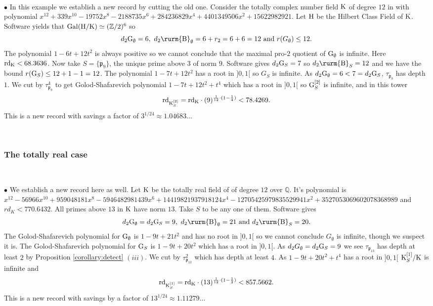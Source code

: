 \documentclass[12pt,a4paper,twoside,english]{smfart}
\def\Q{{\mathbb Q}}
\def\Z{{\mathbb Z}}
\def\p{{\mathfrak p}}
\def\CyB{{{\textnormal{\rurm{B}}}}}
\def\G{{\rm G}}
\def\HH{{\rm H}}
\def\K{{\rm K}}
\def\rd{{\rm rd}}
\def\Gal{{\rm Gal}}
\begin{document}
 \
  
  $\bullet$  
  In this example we establish a new record by cutting the old one.
  Consider the totally complex number field $\K$ of degree $12$ in \cite{Hajir-Maire-JSC} with 
polynomial $x^{12}+339x^{10}-19752x^8-2188735x^6+284236829x^4+4401349506x^2+15622982921$.
 Let $\HH$  be the Hilbert Class Field of 
$\K$.
Software yields that $\Gal(\HH / \K) \simeq (\Z/2)^6$ so 
$$d_2 \G_\emptyset=6,\,\, d_2 \CyB_\emptyset = 6+r_2=6+6=12 \mbox{ and } r(G_\emptyset) \leq 12.$$
The polynomial $1-6t+12t^2$ is always positive so we cannot conclude
that the maximal pro-$2$ quotient of $\G_\emptyset$ is infinite. Here $\rd_{\K} < 68.3636$.
 Now take $S=\{\p_{9}\}$, the unique prime above $3$ of norm $9$. Software gives  $d_2 \G_S=7$ so $d_2 \CyB_S=12$ and 
 we have the bound 
 $r(\G_S) \leq 12+1-1=12$.  The polynomial $1-7t+12t^2$ has a root in $]0,1[$ so $G_S$ is infinite.
   As $d_2 \G_\emptyset=6 < 7 = d_2 \G_S$,
 $\tau_{\p_{9}}$ has depth $1$. We cut by $\tau^4_{\p_{9}}$ to get 
 Golod-Shafarevich  polynomial
  $1-7t+12t^2+t^4$ which has a root in $]0,1[$
so 
$\G_S^{[2]}$ is infinite, and in this tower 
$$\rd_{\K_S^{[2]}} = \rd_\K \cdot (9)^{\frac1{12} \cdot (1-\frac14)}   < 78.4269.$$
  This is a new record with savings  a factor of  $3^{1/24} \approx 1.04683 \dots$
  
  \
  
  
  \subsubsection{The totally real case}
 
 \
 
 $\bullet$  We establish a new record here as well.
 Let $\K$ be the  totally real field of \cite{Hajir-Maire-JSC} of degree $12$ over $\Q$.
 It's polynomial is $x^{12}-56966x^{10}+959048181x^8-5946482981439x^6+14419821937918124x^4-12705425979835529941x^2+3527053069602078368989$
 and $rd_K < 770.6432$.  
 All primes above $13$ in $\K$ have norm $13$. Take $S$ to be any one of them. Software gives 
$$d_2 \G_\emptyset=d_2 \G_S=9,\,\, d_2 \CyB_\emptyset =21 \mbox{ and } d_2 \CyB_S =20.$$
The Golod-Shafarevich polynomial for $\G_\emptyset$ is 
  $1-9t+21t^2$ and has no root in  $]0,1[$ so we cannot conclude $G_\emptyset$ is infinite, though we suspect it is.
The Golod-Shafarevich polynomial for $\G_S$ is  
 $1-9t+20t^2$ which  has a root in  $]0,1[$.
 As $d_2 G_\emptyset = d_2 \G_S=9$ we see $\tau_{\p_{13}}$ has depth at least $2$ by Proposition \ref{corollary:detect} $(iii)$.  We cut by $\tau^2_{\p_{13}}$ which has depth  at least $4$. 
  As $1-9t+20t^2+t^4$ has a root in  $]0,1[$ 
  $\K_S^{[1]}/\K$ is infinite and
  $$\rd_{\K_S^{[1]}} = \rd_\K \cdot (13)^{\frac1{12} \cdot (1-\frac12)}   < 857.5662.$$
This is a new record with savings by a factor of $13^{1/24} \approx 1.11279 \dots$
\end{document}
